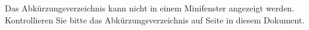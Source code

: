 
Das Abkürzungsverzeichnis kann nicht in einem Minifenster angezeigt werden. Kontrollieren Sie bitte das Abkürzungsverzeichnis auf Seite \pageref{abkuerzungen} in diesem Dokument.

